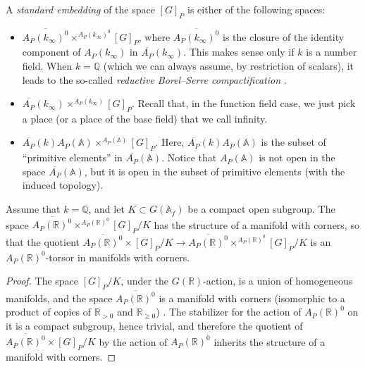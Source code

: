\begin{definition}
 \label{definition-standard-embedding}
A {\it standard embedding} of the space $[G]_P$ is either of the following spaces:
\begin{itemize} 
 \item $\overline{A_P(k_\infty)^0} \times^{A_P(k_\infty)^0} [G]_P$, where $\overline{A_P(k_\infty)^0}$ is the closure of the identity component of $A_P(k_\infty)$ in $\overline{A_P}(k_\infty)$. This makes sense only if $k$ is a number field. When $k=\mathbb Q$ (which we can always assume, by restriction of scalars), it leads to the so-called \emph{reductive Borel--Serre compactification} \cite{Zucker-L2, Borel-Ji}. 
 \item $\overline{A_P}(k_\infty) \times^{A_P(k_\infty)} [G]_P$. Recall that, in the function field case, we just pick a place (or a place of the base field) that we call infinity.
 \item $\overline{A_P}(k)A_P(\mathbb A) \times^{A_P(\mathbb A)} [G]_P$. Here, $\overline{A_P}(k)A_P(\mathbb A)$ is the subset of ``primitive elements'' in $\overline{A_P}(\mathbb A)$. Notice that $A_P(\mathbb A)$ is not open in the space $\overline{A_P}(\mathbb A)$, but it is open in the subset of primitive elements (with the induced topology). 
\end{itemize}
\end{definition}


\begin{lemma}
 \label{lemma-manifold-corners}
Assume that $k=\mathbb Q$, and let $K\subset G(\mathbb A_f)$ be a compact open subgroup. The space $\overline{A_P(\mathbb R)^0} \times^{A_P(\mathbb R)^0} [G]_P/K$ has the structure of a manifold with corners, so that the quotient $\overline{A_P(\mathbb R)^0} \times [G]_P/K \to \overline{A_P(\mathbb R)^0} \times^{A_P(\mathbb R)^0} [G]_P/K$ is an ${A_P(\mathbb R)^0}$-torsor in manifolds with corners. 
\end{lemma}

\begin{proof}
 The space $[G]_P/K$, under the $G(\mathbb R)$-action, is a union of homogeneous manifolds, and the space $\overline{A_P(\mathbb R)^0}$ is a manifold with corners (isomorphic to a product of copies of $\mathbb R_{>0}$ and $\mathbb R_{\ge 0}$) . The stabilizer for the action of $A_P(\mathbb R)^0$ on it is a compact subgroup, hence trivial, and therefore the quotient of $\overline{A_P(\mathbb R)^0} \times [G]_P/K$ by the action of $A_P(\mathbb R)^0$ inherits the structure of a manifold with corners.
\end{proof}

